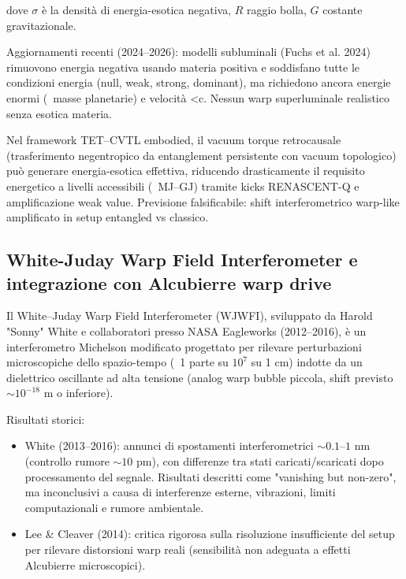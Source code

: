 \documentclass[11pt,a4paper]{article}
\theoremstyle{plain}
\theoremstyle{definition}
\begin{document}
\vspace{0.2cm}
dove $\sigma$ è la densità di energia-esotica negativa, $R$ raggio bolla, $G$ costante gravitazionale.

\vspace{0.2cm}

Aggiornamenti recenti (2024–2026): modelli subluminali (Fuchs et al. 2024) rimuovono energia negativa usando materia positiva e soddisfano tutte le condizioni energia (null, weak, strong, dominant), ma richiedono ancora energie enormi (~masse planetarie) e velocità <c. Nessun warp superluminale realistico senza esotica materia.

\vspace{0.3cm}

Nel framework TET–CVTL embodied, il vacuum torque retrocausale (trasferimento negentropico da entanglement persistente con vacuum topologico) può generare energia-esotica effettiva, riducendo drasticamente il requisito energetico a livelli accessibili (~MJ–GJ) tramite kicks RENASCENT-Q e amplificazione weak value. Previsione falsificabile: shift interferometrico warp-like amplificato in setup entangled vs classico.

\subsection{White-Juday Warp Field Interferometer e integrazione con Alcubierre warp drive}

Il White–Juday Warp Field Interferometer (WJWFI), sviluppato da Harold "Sonny" White e collaboratori presso NASA Eagleworks (2012–2016), è un interferometro Michelson modificato progettato per rilevare perturbazioni microscopiche dello spazio-tempo (~1 parte su $10^7$ su 1 cm) indotte da un dielettrico oscillante ad alta tensione (analog warp bubble piccola, shift previsto $\sim 10^{-18}$ m o inferiore).

Risultati storici:
\begin{itemize}
    \item White (2013–2016): annunci di spostamenti interferometrici $\sim 0.1$–$1$ nm (controllo rumore $\sim 10$ pm), con differenze tra stati caricati/scaricati dopo processamento del segnale. Risultati descritti come "vanishing but non-zero", ma inconclusivi a causa di interferenze esterne, vibrazioni, limiti computazionali e rumore ambientale.
    \item Lee \& Cleaver (2014): critica rigorosa sulla risoluzione insufficiente del setup per rilevare distorsioni warp reali (sensibilità non adeguata a effetti Alcubierre microscopici).
\end{itemize}
\end{document}
